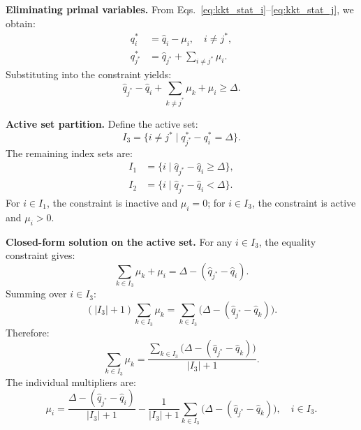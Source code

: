 \documentclass[review,12pt,authoryear]{elsarticle}
\begin{document}
\textbf{Eliminating primal variables.}
From Eqs.~\eqref{eq:kkt_stat_i}--\eqref{eq:kkt_stat_j}, we obtain:
\begin{align}
    q_i^* &= \hat{q}_i - \mu_i, \quad i \neq j^*, \label{eq:kkt_qi} \\
    q_{j^*}^* &= \hat{q}_{j^*} + \sum_{i \neq j^*} \mu_i. \label{eq:kkt_qj}
\end{align}
Substituting into the constraint yields:
\begin{equation}
    \hat{q}_{j^*} - \hat{q}_i + \sum_{k \neq j^*} \mu_k + \mu_i \geq \Delta.
    \label{eq:kkt_substituted}
\end{equation}

\textbf{Active set partition.}
Define the active set:
\begin{equation}
    I_3 = \{i \neq j^* \mid q_{j^*}^* - q_i^* = \Delta\}.
    \label{eq:active_set}
\end{equation}
The remaining index sets are:
\begin{align}
    I_1 &= \{i \mid \hat{q}_{j^*} - \hat{q}_i \geq \Delta\}, \label{eq:I1} \\
    I_2 &= \{i \mid \hat{q}_{j^*} - \hat{q}_i < \Delta\}. \label{eq:I2}
\end{align}
For $i \in I_1$, the constraint is inactive and $\mu_i = 0$; for $i \in I_3$, the constraint is active and $\mu_i > 0$.

\textbf{Closed-form solution on the active set.}
For any $i \in I_3$, the equality constraint gives:
\begin{equation}
    \sum_{k \in I_3} \mu_k + \mu_i = \Delta - (\hat{q}_{j^*} - \hat{q}_i).
    \label{eq:active_eq}
\end{equation}
Summing over $i \in I_3$:
\begin{equation}
    (|I_3| + 1)\sum_{k \in I_3} \mu_k = \sum_{k \in I_3}\bigl(\Delta - (\hat{q}_{j^*} - \hat{q}_k)\bigr).
    \label{eq:sum_mu}
\end{equation}
Therefore:
\begin{equation}
    \sum_{k \in I_3} \mu_k = \frac{\sum_{k \in I_3}\bigl(\Delta - (\hat{q}_{j^*} - \hat{q}_k)\bigr)}{|I_3| + 1}.
    \label{eq:sum_mu_solved}
\end{equation}
The individual multipliers are:
\begin{equation}
    \mu_i = \frac{\Delta - (\hat{q}_{j^*} - \hat{q}_i)}{|I_3| + 1} - \frac{1}{|I_3| + 1}\sum_{k \in I_3}\bigl(\Delta - (\hat{q}_{j^*} - \hat{q}_k)\bigr), \quad i \in I_3.
    \label{eq:mu_i_solved}
\end{equation}
\end{document}
